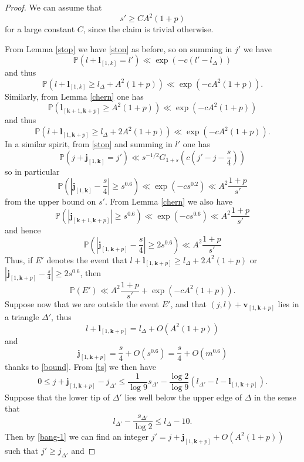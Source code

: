 \documentclass[12pt,a4paper,reqno]{amsart}
\numberwithin{equation}{section}
\theoremstyle{plain}
\theoremstyle{definition}
\renewcommand\P{\mathbb{P}}
\renewcommand\j{\mathbf{j}}
\renewcommand\k{\mathbf{k}}
\renewcommand\v{\mathbf{v}}
\renewcommand\l{\mathbf{l}}
\begin{document}
\begin{proof} We can assume that
\begin{equation}\label{sbig}
s' \geq C A^2 (1+p)
\end{equation}
for a large constant $C$, since the claim is trivial otherwise.

 From Lemma \ref{stop} we have \eqref{ston} as before, so on summing in $j'$ we have
$$ 
\P( l + \l_{[1,k]} = l' ) \ll \exp( - c (l'-l_\Delta) ) $$
and thus
$$ 
\P( l + \l_{[1,k]} \geq l_\Delta + A^2 (1+p) ) \ll \exp( - c A^2 (1+p) ).$$
Similarly, from Lemma \ref{chern} one has
$$ 
\P( \l_{[\k+1,\k+p]} \geq A^2 (1+p) ) \ll \exp( - c A^2 (1+p) )$$
and thus
$$ 
\P( l + \l_{[1,\k+p]} \geq l_\Delta + 2A^2 (1+p) ) \ll \exp( - c A^2 (1+p) ).$$
In a similar spirit, from \eqref{ston} and summing in $l'$ one has
$$
\P( j + \j_{[1,\k]} = j' ) \ll s^{-1/2} G_{1+s}\left( c(j'-j - \frac{s}{4}) \right)$$
so in particular
$$
\P\left( \left|\j_{[1,\k]} - \frac{s}{4}\right| \geq s^{0.6} \right) \ll \exp( - c s^{0.2} ) \ll A^2 \frac{1+p}{s'}$$
from the upper bound on $s'$.  From Lemma \ref{chern} we also have
$$
\P( |\j_{[\k+1,\k+p]}| \geq s^{0.6} ) \ll \exp( - c s^{0.6} ) \ll A^2 \frac{1+p}{s'}$$
and hence
$$
\P\left( \left|\j_{[1,\k+p]} - \frac{s}{4}\right| \geq 2s^{0.6} \right) \ll A^2 \frac{1+p}{s'}$$
Thus, if $E'$ denotes the event that $l + \l_{[1,\k+p]} \geq l_\Delta + 2A^2 (1+p)$ or $|\j_{[1,\k+p]} - \frac{s}{4}| \geq 2s^{0.6}$, then
\begin{equation}\label{pang}
\P( E') \ll A^2 \frac{1+p}{s'} + \exp( - c A^2 (1+p) ).
\end{equation}
Suppose now that we are outside the event $E'$, and that  $(j,l) + \v_{[1,\k+p]}$ lies in a triangle $\Delta'$, thus
\begin{equation}\label{bang-1}
l + \l_{[1,\k+p]} = l_\Delta + O( A^2 (1+p) )
\end{equation}
and
\begin{equation}\label{bang-2}
\j_{[1,\k+p]} = \frac{s}{4} + O(s^{0.6}) = \frac{s}{4} + O(m^{0.6})
\end{equation} 
thanks to \eqref{bound}.
From \eqref{ts} we then have
$$0 \leq j+\j_{[1,\k+p]}-j_{\Delta'} \leq \frac{1}{\log 9} s_{\Delta'} - \frac{\log 2}{\log 9} (l_{\Delta'}-l-\l_{[1,\k+p]}).$$
Suppose that the lower tip of $\Delta'$ lies well below the upper edge of $\Delta$ in the sense that
$$ l_{\Delta'} - \frac{s_{\Delta'}}{\log 2} \leq l_\Delta - 10.$$
Then by \eqref{bang-1} we can find an integer $j' = j+\j_{[1,\k+p]} + O( A^2 (1+p) )$ such that $j' \geq j_{\Delta'}$ and

\end{proof}
\end{document}
